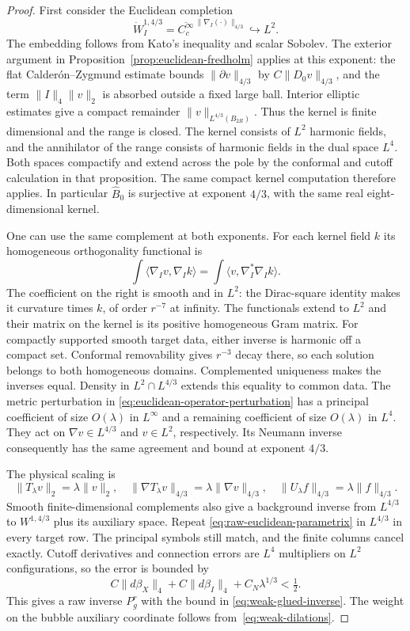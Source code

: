 \documentclass[11pt]{amsart}
\theoremstyle{definition}
\theoremstyle{remark}
\theoremstyle{plain}
\begin{document}
\begin{proof}
First consider the Euclidean completion
\[
 \dot W_I^{1,4/3}
 =\overline{C_c^\infty}^{\,\|\nabla_I(\cdot)\|_{4/3}}
 \hookrightarrow L^2.
\]
The embedding follows from Kato's inequality and scalar Sobolev.
The exterior argument in Proposition~\ref{prop:euclidean-fredholm}
applies at this exponent: the flat Calder\'on--Zygmund estimate bounds
$\|\partial v\|_{4/3}$ by $C\|D_0v\|_{4/3}$, and the term
$\|I\|_4\|v\|_2$ is absorbed outside a fixed large ball.  Interior
elliptic estimates give a compact remainder
$\|v\|_{L^{4/3}(B_{2R})}$.  Thus the kernel is finite dimensional and
the range is closed.  The kernel consists of $L^2$ harmonic fields,
and the annihilator of the range consists of harmonic fields in the
dual space $L^4$.  Both spaces compactify and extend across the pole
by the conformal and cutoff calculation in that proposition.
The same compact kernel computation therefore applies.  In particular
$\widehat B_0$ is surjective at exponent $4/3$, with the same real
eight-dimensional kernel.

One can use the same complement at both exponents.  For each kernel
field $k$ its homogeneous orthogonality functional is
\[
 \int\langle\nabla_Iv,\nabla_Ik\rangle
 =\int\langle v,\nabla_I^*\nabla_Ik\rangle.
\]
The coefficient on the right is smooth and in $L^2$: the Dirac-square
identity makes it curvature times $k$, of order $r^{-7}$ at infinity.
The functionals extend to $L^2$ and their matrix on the kernel is its
positive homogeneous Gram matrix.  For compactly supported smooth
target data, either inverse is harmonic off a compact set.
Conformal removability gives $r^{-3}$ decay there, so each solution
belongs to both homogeneous domains.  Complemented uniqueness makes
the inverses equal.  Density in $L^2\cap L^{4/3}$ extends this equality
to common data.  The metric perturbation in
\eqref{eq:euclidean-operator-perturbation} has a principal coefficient
of size $O(\lambda)$ in $L^\infty$ and a remaining coefficient of
size $O(\lambda)$ in $L^4$.  They act on $\nabla v\in L^{4/3}$
and $v\in L^2$, respectively.  Its Neumann inverse consequently
has the same agreement and bound at exponent $4/3$.

The physical scaling is
\begin{equation}\label{eq:weak-dilations}
 \|T_\lambda v\|_2=\lambda\|v\|_2,\quad
 \|\nabla T_\lambda v\|_{4/3}=\lambda\|\nabla v\|_{4/3},\quad
 \|U_\lambda f\|_{4/3}=\lambda\|f\|_{4/3}.
\end{equation}
Smooth finite-dimensional complements also give a background inverse
from $L^{4/3}$ to $W^{1,4/3}$ plus its auxiliary space.  Repeat
\eqref{eq:raw-euclidean-parametrix} in $L^{4/3}$ in every target row.
The principal symbols still match, and the finite columns cancel
exactly.  Cutoff derivatives and connection errors are $L^4$
multipliers on $L^2$ configurations, so the error is bounded by
\[
 C\|d\beta_X\|_4+C\|d\beta_I\|_4+C_N\lambda^{1/3}<\tfrac12.
\]
This gives a raw inverse $P_g^r$ with the bound in
\eqref{eq:weak-glued-inverse}.  The weight on the bubble auxiliary
coordinate follows from~\eqref{eq:weak-dilations}.


\end{proof}
\end{document}
